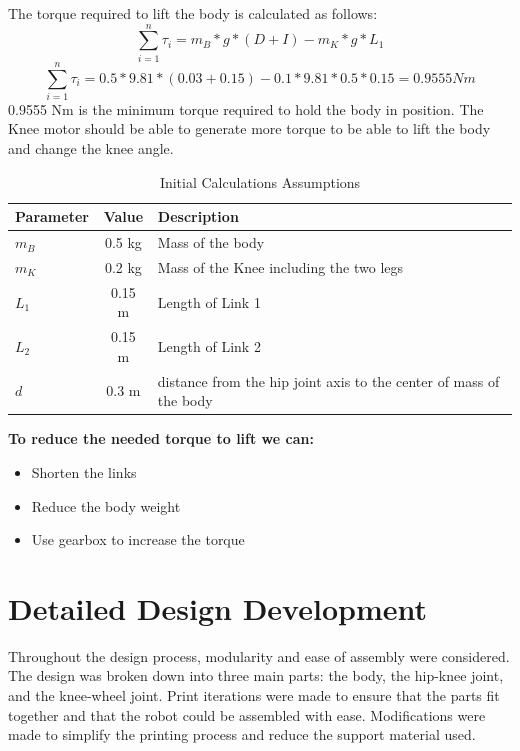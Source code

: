 The torque required to lift the body is calculated as follows:
\begin{equation}
	\sum_{i=1}^{n} \tau_{i}=m_{B}*g*(D+I)-m_{K}*g*L_{1}
\end{equation}
\begin{equation}
	\sum_{i=1}^{n} \tau_{i}=0.5*9.81*(0.03+0.15)-0.1*9.81*0.5*0.15=0.9555 Nm
\end{equation}
0.9555 Nm is the minimum torque required to hold the body in position.
The Knee motor should be able to generate more torque to be able to lift the body and change the knee angle.

\begin{table}[h]
	\centering
	\caption{Initial Calculations Assumptions}
	\label{tab:initialcalculationsassumptions}
	\begin{tabular}{lcl}
		\toprule
		Parameter & Value & Description 			  \\
		\midrule
		$m_B$         & 0.5 kg  & Mass of the body  \\
		$m_K$         & 0.2 kg  & Mass of the Knee including the two legs\\
		$L_1$         & 0.15 m   & Length of Link 1  \\
		$L_2$         & 0.15 m   & Length of Link 2   \\
		$d$ 	  	  & 0.3 m   & distance from the hip joint axis to the center of mass of the body   \\
		\bottomrule
	\end{tabular}
\end{table}

\begin{notebox}
	\textbf{To reduce the needed torque to lift we can:}
	\begin{itemize}
		\item Shorten the links
		\item Reduce the body weight
		\item Use gearbox to increase the torque
	\end{itemize}
\end{notebox}
\newpage
\section{Detailed Design Development}
Throughout the design process, modularity and ease of assembly were considered.
The design was broken down into three main parts: the body, the hip-knee joint, and the knee-wheel joint.
Print iterations were made to ensure that the parts fit together and that the robot could be assembled with ease. Modifications were made to simplify the printing process and reduce the support material used.


